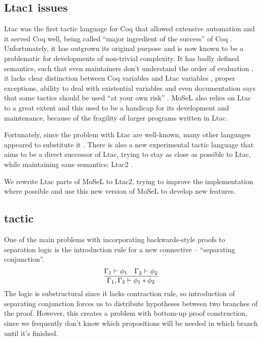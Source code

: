 \subsection{Ltac1 issues}
\label{sec:ltac1-issues}
Ltac was the first tactic language for Coq that allowed extensive automation and it served Coq well, being called ``major ingredient of the success'' of Coq \cite{pedrotLtac2TacticalWarfare2019}.
Unfortunately, it has outgrown its original purpose and is now known to be a problematic for developments of non-trivial complexity.
It has badly defined semantics, such that even maintainers don't understand the order of evaluation \cite{pedrotLtacInternals2016}, it lacks clear distinction between Coq variables and Ltac variables \cite{pedrotLtacInternals2016}, proper exceptions, ability to deal with existential variables and even documentation says that some tactics should be used ``at your own risk'' \cite[Section~3.3.1]{thecoqdevelopmentteamCoqProofAssistant2020}.
MoSeL also relies on Ltac to a great extent and this used to be a handicap for its development and maintenance, because of the fragility of larger programs written in Ltac.

Fortunately, since the problem with Ltac are well-known, many other languages appeared to substitute it \cite{malechaExtensibleEfficientAutomation2016, zilianiMtacMonadTyped2013, kaiserMtac2TypedTactics2018a, tassiElpiExtensionLanguage2018}.
There is also a new experimental tactic language that aims to be a direct successor of Ltac, trying to stay as close as possible to Ltac, while maintaining sane semantics: Ltac2 \cite{pedrotLtac2TacticalWarfare2019}.

We rewrite Ltac parts of MoSeL to Ltac2, trying to improve the implementation where possible and use this new version of MoSeL to develop new features.

\subsection{ tactic}
\label{sec:isplit-tactic}

One of the main problems with incorporating backwards-style proofs to separation logic is the introduction rule for a new connective -- ``separating conjunction''.
\[\infer{\Gamma_1, \Gamma_2 \vdash \phi_1 \ast \phi_2}
        {\Gamma_1 \vdash \phi_1 &
         \Gamma_2 \vdash \phi_2} \]
The logic is substructural since it lacks contraction rule, so introduction of separating conjunction forces us to distribute hypotheses between two branches of the proof.
However, this creates a problem with bottom-up proof construction, since we frequently don't know which propositions will be needed in which branch until it's finished.

